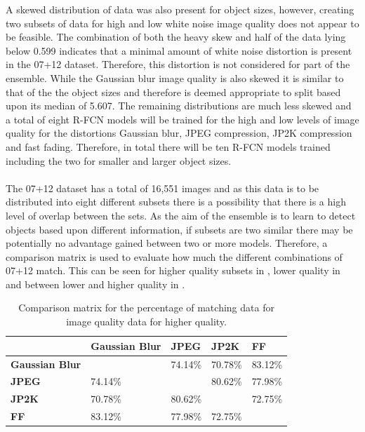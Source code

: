 A skewed distribution of data was also present for object sizes, however, creating two subsets of data for high and low white noise image quality does not appear to be feasible. The combination of both the heavy skew and half of the data lying below 0.599 indicates that a minimal amount of white noise distortion is present in the 07+12 dataset. Therefore, this distortion is not considered for part of the ensemble. While the Gaussian blur image quality is also skewed it is similar to that of the the object sizes and therefore is deemed appropriate to split based upon its median of 5.607. The remaining distributions are much less skewed and a total of eight R-FCN models will be trained for the high and low levels of image quality for the distortions Gaussian blur, JPEG compression, JP2K compression and fast fading. Therefore, in total there will be ten R-FCN models trained including the two for smaller and larger object sizes.
\\\\
The 07+12 dataset has a total of 16,551 images and as this data is to be distributed into eight different subsets there is a possibility that there is a high level of overlap between the sets. As the aim of the ensemble is to learn to detect objects based upon different information, if subsets are two similar there may be potentially no advantage gained between two or more models. Therefore, a comparison matrix is used to evaluate how much the different combinations of 07+12 match. This can be seen for higher quality subsets in , lower quality in  and between lower and higher quality in .

\begin{table}[h]
\centering
\caption{Comparison matrix for the percentage of matching data for image quality data for higher quality.}
\label{tab:highcomp}
\begin{tabular}{|l|l|l|l|l|}
\hline
             & \textbf{Gaussian Blur}  & \textbf{JPEG} & \textbf{JP2K} & \textbf{FF}    \\ \hline
\textbf{Gaussian Blur} &                & 74.14\% & 70.78\% & 83.12\% \\ \hline
\textbf{JPEG}   & 74.14\% &                & 80.62\% & 77.98\% \\ \hline
\textbf{JP2K}   & 70.78\%  & 80.62\% &                & 72.75\% \\ \hline
\textbf{FF}   & 83.12\% & 77.98\% & 72.75\% &                \\ \hline
\end{tabular}
\end{table}

